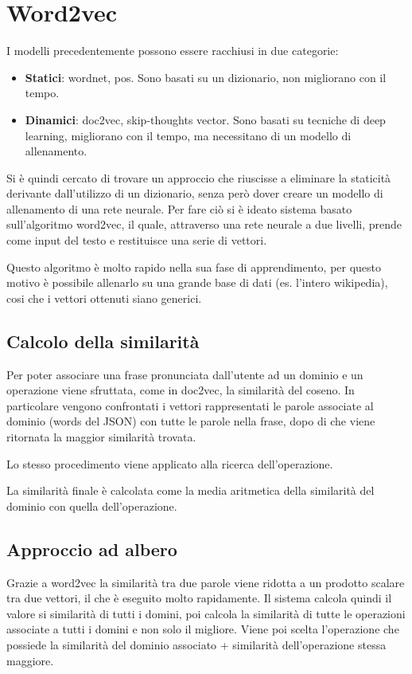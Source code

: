 \documentclass[twoside]{supsistudent}
\begin{document}
\section{Word2vec}
I modelli precedentemente possono essere racchiusi in due categorie:
\begin{itemize}
  \item \textbf{Statici}: wordnet, pos. Sono basati su un dizionario, non migliorano con il tempo.
  \item \textbf{Dinamici}: doc2vec, skip-thoughts vector. Sono basati su tecniche di deep learning, migliorano con il tempo, ma necessitano di un modello di allenamento.
\end{itemize}
Si è quindi cercato di trovare un approccio che riuscisse a eliminare la staticità derivante dall'utilizzo di un dizionario, senza però dover creare un modello di allenamento di una rete neurale.
Per fare ciò si è ideato sistema basato sull'algoritmo word2vec, il quale, attraverso una rete neurale a due livelli, prende come input del testo e restituisce una serie di vettori. 

Questo algoritmo è molto rapido nella sua fase di apprendimento, per questo motivo è possibile allenarlo su una grande base di dati (es. l'intero wikipedia), cosi che i vettori ottenuti siano generici.\cite{word2vec}
\subsection{Calcolo della similarità}
Per poter associare una frase pronunciata dall'utente ad un dominio e un operazione viene sfruttata, come in doc2vec, la similarità del coseno. In particolare vengono confrontati i vettori rappresentati le parole associate al dominio (words del JSON) con tutte le parole nella frase, dopo di che viene ritornata la maggior similarità trovata.

Lo stesso procedimento viene applicato alla ricerca dell'operazione. 

La similarità finale è calcolata come la media aritmetica della similarità del dominio con quella dell'operazione.
\subsection{Approccio ad albero}
Grazie a word2vec la similarità tra due parole viene ridotta a un prodotto scalare tra due vettori, il che è eseguito molto rapidamente. Il sistema calcola quindi il valore si similarità di tutti i domini, poi calcola la similarità di tutte le operazioni associate a tutti i domini e non solo il migliore. Viene poi scelta l'operazione che possiede la similarità del dominio associato + similarità dell'operazione stessa maggiore.
\end{document}
